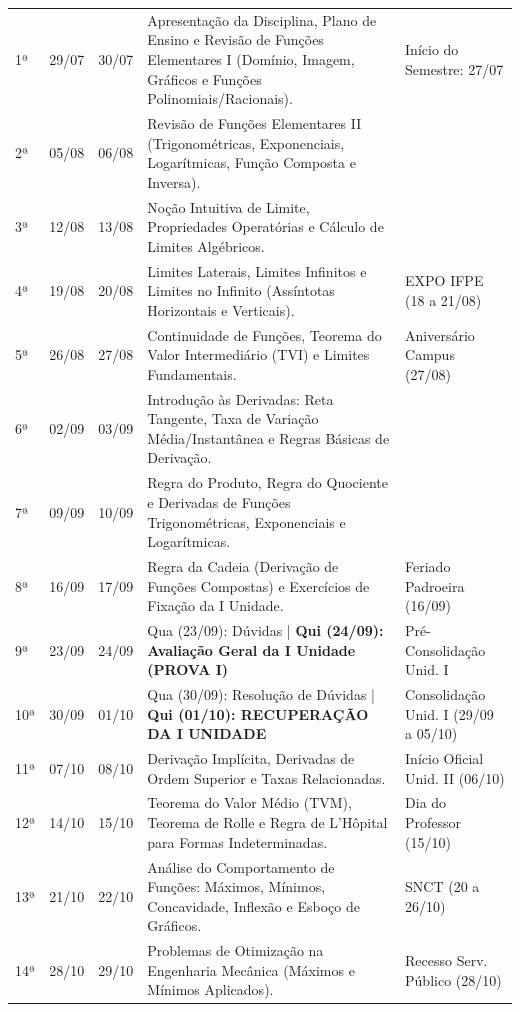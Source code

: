 \documentclass[12pt,a4paper]{article}
\begin{document}
\begin{longtable}{p{0.8cm} p{1.8cm} p{1.8cm} p{7.7cm} p{4.3cm}}
1ª & 29/07 & 30/07 & Apresentação da Disciplina, Plano de Ensino e Revisão de Funções Elementares I (Domínio, Imagem, Gráficos e Funções Polinomiais/Racionais). & Início do Semestre: 27/07 \\
\rowcolor{lightgrey}
2ª & 05/08 & 06/08 & Revisão de Funções Elementares II (Trigonométricas, Exponenciais, Logarítmicas, Função Composta e Inversa). & \\
3ª & 12/08 & 13/08 & Noção Intuitiva de Limite, Propriedades Operatórias e Cálculo de Limites Algébricos. & \\
\rowcolor{lightgrey}
4ª & 19/08 & 20/08 & Limites Laterais, Limites Infinitos e Limites no Infinito (Assíntotas Horizontais e Verticais). & EXPO IFPE (18 a 21/08) \\
5ª & 26/08 & 27/08 & Continuidade de Funções, Teorema do Valor Intermediário (TVI) e Limites Fundamentais. & Aniversário Campus (27/08) \\
\rowcolor{lightgrey}
6ª & 02/09 & 03/09 & Introdução às Derivadas: Reta Tangente, Taxa de Variação Média/Instantânea e Regras Básicas de Derivação. & \\
7ª & 09/09 & 10/09 & Regra do Produto, Regra do Quociente e Derivadas de Funções Trigonométricas, Exponenciais e Logarítmicas. & \\
\rowcolor{lightgrey}
8ª & 16/09 & 17/09 & Regra da Cadeia (Derivação de Funções Compostas) e Exercícios de Fixação da I Unidade. & Feriado Padroeira (16/09) \\
9ª & 23/09 & 24/09 & Qua (23/09): Dúvidas | \textbf{Qui (24/09): Avaliação Geral da I Unidade (PROVA I)} & Pré-Consolidação Unid. I \\
\rowcolor{lightgrey}
10ª & 30/09 & 01/10 & Qua (30/09): Resolução de Dúvidas | \textbf{Qui (01/10): RECUPERAÇÃO DA I UNIDADE} & Consolidação Unid. I (29/09 a 05/10) \\
11ª & 07/10 & 08/10 & Derivação Implícita, Derivadas de Ordem Superior e Taxas Relacionadas. & Início Oficial Unid. II (06/10) \\
\rowcolor{lightgrey}
12ª & 14/10 & 15/10 & Teorema do Valor Médio (TVM), Teorema de Rolle e Regra de L'Hôpital para Formas Indeterminadas. & Dia do Professor (15/10) \\
13ª & 21/10 & 22/10 & Análise do Comportamento de Funções: Máximos, Mínimos, Concavidade, Inflexão e Esboço de Gráficos. & SNCT (20 a 26/10) \\
\rowcolor{lightgrey}
14ª & 28/10 & 29/10 & Problemas de Otimização na Engenharia Mecânica (Máximos e Mínimos Aplicados). & Recesso Serv. Público (28/10) \\

\end{longtable}
\end{document}
